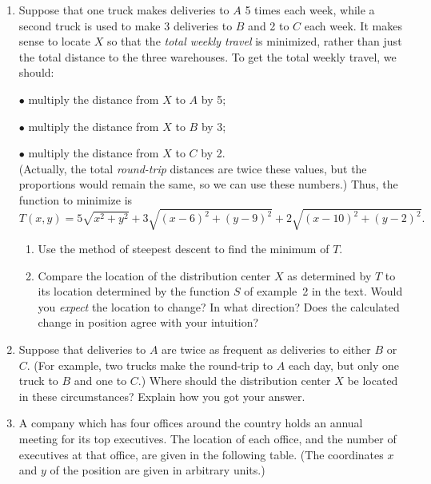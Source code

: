 \begin{enumerate}
\item Suppose that one truck makes deliveries to $A$ 5 times each week,
while a second truck is used to make 3 deliveries to $B$ and 2 to $C$
each week.  It makes sense to locate $X$ so that the {\em total weekly
  travel\/} is minimized, rather than just the total distance to the
three warehouses.  To get the total weekly travel, we should:

\noindent$\bullet$ multiply the distance from $X$ to $A$ by 5;

\noindent$\bullet$ multiply the distance from $X$ to $B$ by 3;

\noindent$\bullet$ multiply the distance from $X$ to $C$ by 2.\\ 
(Actually, the total {\em round-trip\/} distances are twice these
values, but the proportions would remain the same, so we can use these
numbers.)  Thus, the function to minimize is
        \[
T(x, y) = 5\sqrt{x^2 + y^2} + 3\sqrt{(x-6)^2 + (y-9)^2} 
                + 2\sqrt{(x-10)^2 + (y-2)^2}.
\]


  \begin{enumerate}
  \item Use the method of steepest descent to find the minimum of $T$.

  \item Compare the location of the distribution center $X$ as determined
by $T$ to its location determined by the function $S$ of example~2 in
the text.  Would you {\em expect\/} the location to change?  In what
direction?  Does the calculated change in position agree with your
intuition?


\end{enumerate}
\item Suppose that deliveries to $A$ are twice as frequent as
deliveries to either $B$ or $C$.  (For example, two trucks make the
round-trip to $A$ each day, but only one truck to $B$ and one to $C$.)
Where should the distribution center $X$ be located in these
circumstances?  Explain how you got your answer.



\item A company which has four offices around the country holds an
annual meeting for its top executives.  The location of each office,
and the number of executives at that office, are given in the
following table.  (The coordinates $x$ and $y$ of the position are
given in arbitrary units.)
\begin{center}
\addtolength{\tabcolsep}{6pt}



\end{center}
\end{enumerate}

